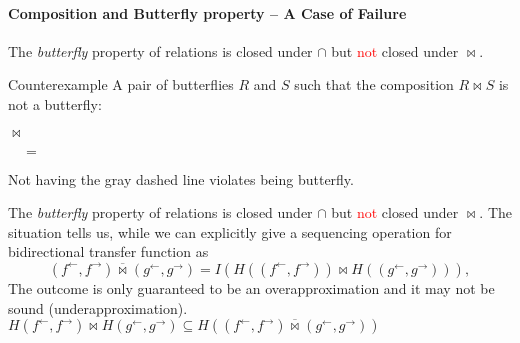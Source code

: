 \documentclass{llncs}
\newcommand{\ff}{{f^{\rightarrow}}}
\newcommand{\fb}{{f^{\leftarrow}}}
\newcommand{\gf}{{g^{\rightarrow}}}
\newcommand{\gb}{{g^{\leftarrow}}}
\newcommand{\bowtielift}{\mathbin{\overline{\bowtie}}}
\newcommand{\rotleq}{\rotatebox[origin=c]{90}{$\leq$}}
\newcommand{\red}[1]{\textcolor{red}{#1}}
\begin{document}
  \paragraph{Composition and Butterfly property -- A Case of Failure}
  The \emph{butterfly} property of relations is closed under $\cap$ but \red{not} closed under $\bowtie$.

  Counterexample
  A pair of butterflies $R$ and $S$ such that the composition $R \bowtie S$ is not a butterfly:
  \begin{center}
    $\bowtie$
    $\quad=\quad$
  \end{center}
  Not having the gray dashed line violates being butterfly.


  The \emph{butterfly} property of relations is closed under $\cap$ but \red{not} closed under $\bowtie$.
  The situation tells us, while we can explicitly give a sequencing operation for bidirectional transfer function as
  \begin{equation*}
    (\fb,\ff) \bowtielift (\gb,\gf) = I(H((\fb, \ff)) \bowtie H((\gb , \gf))),
  \end{equation*}
  The outcome is only guaranteed to be an overapproximation and it may not be sound (underapproximation).
  $H(\fb, \ff) \bowtie H(\gb, \gf) \subseteq H((\fb, \ff) \bowtielift (\gb, \gf))$
\end{document}
